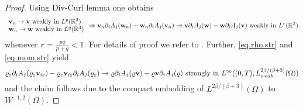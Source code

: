 \documentclass{article}
\newcommand{\bw}{{\bf w}}
\newcommand{\vw}{\bw}
\newcommand{\bv}{{\bf v}}
\newcommand{\vv}{\bv}
\numberwithin{equation}{section}
\begin{document}
\begin{proof}
Using Div-Curl lemma one obtains
$$
\begin{array}{l}
\vv_n\to \vv \ \mbox{weakly in }L^p(\mathbb R^3)\\
\vw_n\to \vw \ \mbox{weakly in }L^q(\mathbb R^3)
\end{array}
\Rightarrow 
\vv_n \partial_i A_j(\vw_n) - \vw_n \partial_i A_j(\vv_n)\to \vv \partial_i A_j(\vw) - \vw \partial_i A_j(\vv)\ \mbox{weakly in }L^r(\mathbb R^3)
$$
whenever $r = \frac{pq}{p+q}<1$. For details of proof we refer to \cite[Lemma 3.4]{FeNoPe}. Further, \eqref{eq.rho.str} and \eqref{eq.mom.str} yield
$$
\varrho_\varepsilon \partial_iA_j (\varrho_\varepsilon \vv_{i\varepsilon}) - \varrho_\varepsilon \vv_{i\varepsilon} \partial_i A_j(\varrho_\varepsilon)\to \varrho \partial_i A_j(\varrho \vv) - \varrho \vv \partial_i A_j(\varrho)\ \mbox{strongly in }L^\infty((0,T),L^{2\beta/(\beta+3)}_{weak}(\Omega))
$$
and the claim follows due to the compact embedding of $L^{2\beta/(\beta+3)}(\Omega)$ to $W^{-1,2}(\Omega)$.
\end{proof}
\end{document}
